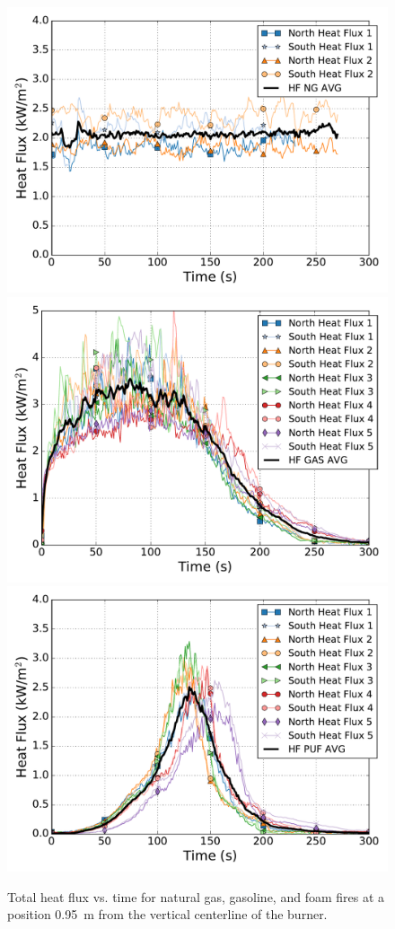 \documentclass[twoside]{uocthesis}
\begin{document}
{\begin{figure}[p]
  \centering
  \includegraphics[width=.635\columnwidth]{../Figures/HF_NG}\\
  \includegraphics[width=.635\columnwidth]{../Figures/HF_GAS}\\
  \includegraphics[width=.635\columnwidth]{../Figures/HF_PUF}\\
  \caption[Total heat flux vs. time for natural gas, gasoline, and foam fires at 0.95~m]{Total heat flux vs. time for natural gas, gasoline, and foam fires at a position 0.95~m from the vertical centerline of the burner.}
  \label{Flux}
\end{figure}

}
\end{document}
